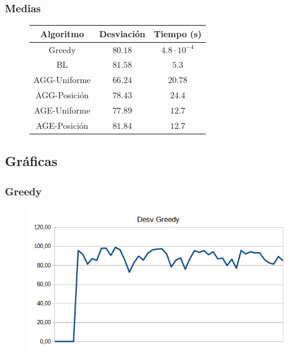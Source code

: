 \documentclass{article}
\begin{document}
    \pagebreak
    \subsubsection{Medias}

    \begin{figure}[h]
    \centering
    \begin{tabular}{ |c|c|c| }
        \hline
        \textbf{Algoritmo} & \textbf{Desviación} & \textbf{Tiempo (s)} \\
        \hline
        Greedy             & $80.18$             & $4.8 \cdot 10^{-4}$ \\
        \hline
        BL                 & $81.58$             & $5.3$               \\
        \hline
        AGG-Uniforme       & $66.24$             & $20.78$             \\
        \hline
        AGG-Posición       & $78.43$             & $24.4$              \\
        \hline
        AGE-Uniforme       & $77.89$             & $12.7$              \\
        \hline
        AGE-Posición       & $81.84$             & $12.7$              \\
        \hline
    \end{tabular}
\end{figure}

    \subsection{Gráficas}

    \subsubsection{Greedy}

    \begin{figure}[h]
        \centering
        \includegraphics[width=\textwidth]{greedy.png}
    \end{figure}
\end{document}
